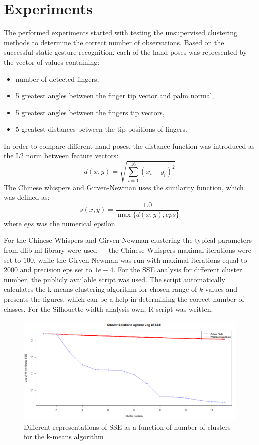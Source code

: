\section{Experiments}



The performed experiments started with testing the unsupervised clustering methods to determine the correct number of observations.
Based on the successful static gesture recognition, each of the hand poses was represented by the vector of values containing:
\begin{itemize}
\item number of detected fingers,
\item 5 greatest angles between the finger tip vector and palm normal,
\item 5 greatest angles between the fingers tip vectors,
\item 5 greatest distances between the tip positions of fingers.
\end{itemize}
In order to compare different hand poses, the distance function was introduced as the L2 norm between feature vectors:
\begin{equation}
d(x,y) = \sqrt{ \sum_{i=1}^{16} (x_i - y_i)^2 }
\end{equation}
The Chinese whispers and Girven-Newman uses the similarity function, which was defined as: 
\begin{equation}
s(x,y) = \frac{1.0}{ \max{\{d(x,y), eps\}}}
\end{equation}
where $eps$ was the numerical epsilon.

For the Chinese Whispers and Girven-Newman clustering the typical parameters from dlib-ml library were used --- the Chinese Whispers maximal iterations were set to $100$, while the Girven-Newman was run with maximal iterations equal to $2000$ and precision eps set to $1e-4$.
For the SSE analysis for different cluster number, the publicly available script was used\cite{SSE}. 
The script automatically calculates the k-means clustering algorithm for chosen range of $k$ values and presents the figures, which can be a help in determining the correct number of classes.
For the Silhouette width analysis own, R script was written.



\begin{figure}[htp!]
\centering
 \includegraphics[width=1.0\columnwidth]{figures/SSE1.png}
 \caption{Different representations of SSE as a function of number of clusters for the k-means algorithm}
 \label{dynamicSSE}
\end{figure}

